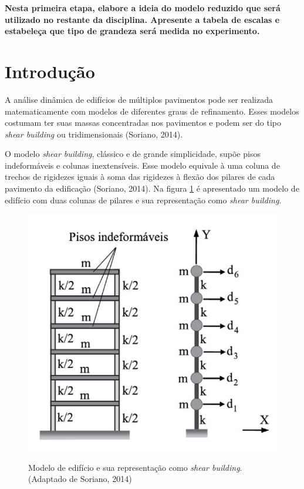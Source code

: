 \textbf{Nesta primeira etapa, elabore a ideia do modelo reduzido que será utilizado no restante da disciplina. Apresente a tabela de escalas e estabeleça que tipo de grandeza será medida no experimento.}

\section{Introdução}

A análise dinâmica de edifícios de múltiplos pavimentos pode ser realizada matematicamente com modelos de diferentes graus de refinamento. Esses modelos costumam ter suas massas concentradas nos pavimentos e podem ser do tipo \textit{shear building} ou tridimensionais (Soriano, 2014).

O modelo \textit{shear building}, clássico e de grande simplicidade, supõe pisos indeformáveis e colunas inextensíveis. Esse modelo equivale à uma coluna de trechos de rigidezes iguais à soma das rigidezes à flexão dos pilares de cada pavimento da edificação (Soriano, 2014). Na figura \ref{fig:shearb} é apresentado um modelo de edifício com duas colunas de pilares e sua representação como \textit{shear building}.


\begin{figure}
	\centering
	\caption{Modelo de edifício e sua representação como \textit{shear building}.\\ \small{(Adaptado de Soriano, 2014)}}
	\includegraphics[scale=0.39]{../Images/ShearBuilding}
	\label{fig:shearb}
\end{figure}



